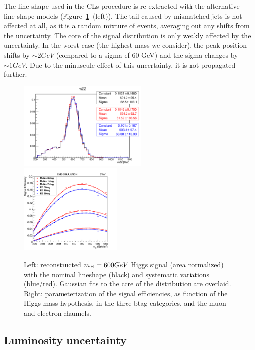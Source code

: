 The line-shape used in the CLs procedure is re-extracted with the alternative line-shape models (Figure~\ref{fig:lineshape}~(left)). The tail caused by mismatched jets is not affected at all, as it is a random mixture of events, averaging out any shifts from the uncertainty. The core of the signal distribution is only weakly affected by the uncertainty. In the worst case (the highest mass we consider), the peak-position shifts by $\sim2 GeV$ (compared to a sigma of 60 GeV{}) and the sigma changes by $\sim1 GeV$. Due to the minuscule effect of this uncertainty, it is not propagated further.

\begin{figure}[htb]
\begin{center}
\centerline{
\includegraphics[width=0.56\textwidth]{plots/lineshapeunc.pdf}
\includegraphics[width=0.44\textwidth]{plots/all_signal_effs.png}
}
\caption{Left: reconstructed $m_{\mathrm{H}} = 600 GeV$ Higgs signal (area normalized) with the nominal lineshape (black) and systematic variations (blue/red). Gaussian fits to the core of the distribution are overlaid. Right: parameterization of the signal efficiencies, as function of the Higgs mass hypothesis, in the three btag categories, and the muon and electron channels.
}
\label{fig:lineshape}
\end{center}
\end{figure}



\subsection{Luminosity uncertainty}

